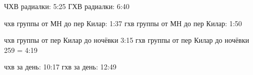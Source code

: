 
















ЧХВ радиалки: 5:25
ГХВ радиалки: 6:40

чхв группы от МН до пер Килар: 1:37
гхв группы от МН до пер Килар: 1:50

чхв группы от пер Килар до ночёвки 3:15
гхв группы от пер Килар до ночёвки 259 = 4:19

чхв за день: 10:17
гхв за день: 12:49

    \FloatBarrier
